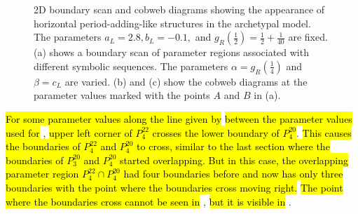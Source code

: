 \begin{figure}
	\centering
	\caption[2D boundary scan and cobweb diagrams showing the appearance of horizontal period-adding-like structures in the archetypal model]{
		2D boundary scan and cobweb diagrams showing the appearance of horizontal period-adding-like structures in the archetypal model.
		The parameters $a_L = 2.8, b_L = -0.1,$ and $g_R\left(\frac{1}{2}\right) = \frac{1}{2} + \frac{1}{40}$ are fixed.
		(a) shows a boundary scan of parameter regions associated with different symbolic sequences.
		The parameters $\alpha = g_R\left(\frac{1}{4}\right)$ and $\beta = c_L$ are varied.
		(b) and (c) show the cobweb diagrams at the parameter values marked with the points $A$ and $B$ in (a).
	}
\end{figure}

\hl{For some parameter values along the line given by}  \hl{between the parameter values used for} , \hl{upper left corner of $P^{22}_4$ crosses the lower boundary of $P^{20}_4$}.
\hl{
	This causes the boundaries of $P^{22}_4$ and $P^{20}_4$ to cross, similar to the last section where the boundaries of $P^{20}_3$ and $P^{20}_4$ started overlapping.
	But in this case, the overlapping parameter region $P^{22}_4 \cap P^{20}_4$ had four boundaries before and now has only three boundaries with the point where the boundaries cross moving right.
}
\hl{The point where the boundaries cross cannot be seen in} , \hl{but it is visible in} .

